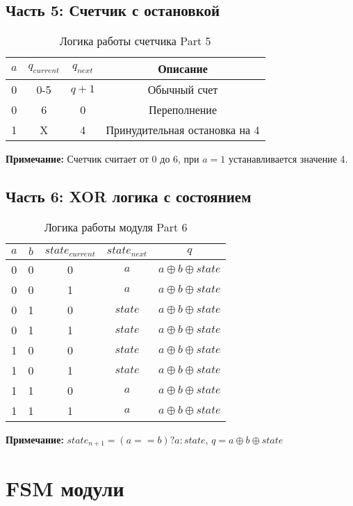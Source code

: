 \documentclass[12pt,a4paper]{article}
\begin{document}
\subsection{Часть 5: Счетчик с остановкой}

\begin{table}[h]
\centering
\caption{Логика работы счетчика Part 5}
\begin{tabular}{|c|c|c|c|}
\hline
$a$ & $q_{current}$ & $q_{next}$ & Описание \\
\hline
0 & 0-5 & $q + 1$ & Обычный счет \\
0 & 6 & 0 & Переполнение \\
1 & X & 4 & Принудительная остановка на 4 \\
\hline
\end{tabular}
\end{table}

\textbf{Примечание:} Счетчик считает от 0 до 6, при $a=1$ устанавливается значение 4.

\subsection{Часть 6: XOR логика с состоянием}

\begin{table}[h]
\centering
\caption{Логика работы модуля Part 6}
\begin{tabular}{|c|c|c|c|c|}
\hline
$a$ & $b$ & $state_{current}$ & $state_{next}$ & $q$ \\
\hline
0 & 0 & 0 & $a$ & $a \oplus b \oplus state$ \\
0 & 0 & 1 & $a$ & $a \oplus b \oplus state$ \\
0 & 1 & 0 & $state$ & $a \oplus b \oplus state$ \\
0 & 1 & 1 & $state$ & $a \oplus b \oplus state$ \\
1 & 0 & 0 & $state$ & $a \oplus b \oplus state$ \\
1 & 0 & 1 & $state$ & $a \oplus b \oplus state$ \\
1 & 1 & 0 & $a$ & $a \oplus b \oplus state$ \\
1 & 1 & 1 & $a$ & $a \oplus b \oplus state$ \\
\hline
\end{tabular}
\end{table}

\textbf{Примечание:} $state_{n+1} = (a == b) ? a : state$, $q = a \oplus b \oplus state$

\section{FSM модули}
\end{document}
